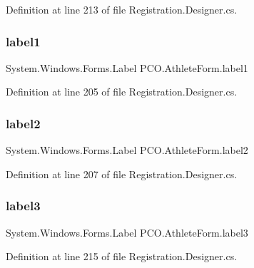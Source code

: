Definition at line 213 of file Registration.\+Designer.\+cs.

\mbox{\label{classPCO_1_1AthleteForm_a1f5940f03f4ba024ef0d91eff986050f}} 
\subsubsection{\texorpdfstring{label1}{label1}}
{\footnotesize\ttfamily System.\+Windows.\+Forms.\+Label P\+C\+O.\+Athlete\+Form.\+label1\hspace{0.3cm}{\ttfamily [private]}}



Definition at line 205 of file Registration.\+Designer.\+cs.

\mbox{\label{classPCO_1_1AthleteForm_a5adafafd087ea1056db97756730cdd2f}} 
\subsubsection{\texorpdfstring{label2}{label2}}
{\footnotesize\ttfamily System.\+Windows.\+Forms.\+Label P\+C\+O.\+Athlete\+Form.\+label2\hspace{0.3cm}{\ttfamily [private]}}



Definition at line 207 of file Registration.\+Designer.\+cs.

\mbox{\label{classPCO_1_1AthleteForm_ace6b3f36933dacffe36ed344aaded395}} 
\subsubsection{\texorpdfstring{label3}{label3}}
{\footnotesize\ttfamily System.\+Windows.\+Forms.\+Label P\+C\+O.\+Athlete\+Form.\+label3\hspace{0.3cm}{\ttfamily [private]}}



Definition at line 215 of file Registration.\+Designer.\+cs.


